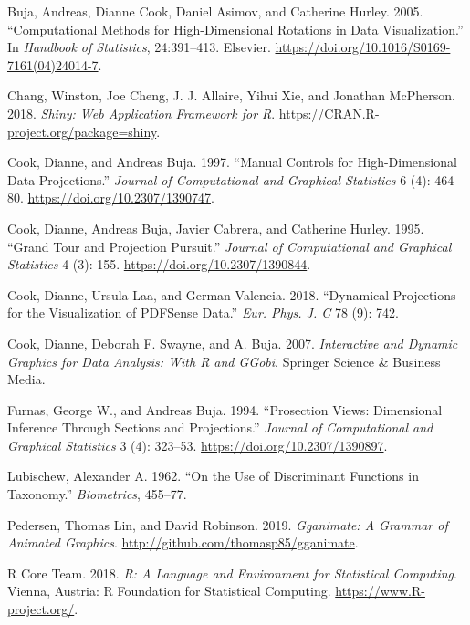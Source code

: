 \hypertarget{refs}{}
\leavevmode\hypertarget{ref-buja_computational_2005}{}%
Buja, Andreas, Dianne Cook, Daniel Asimov, and Catherine Hurley. 2005. ``Computational Methods for High-Dimensional Rotations in Data Visualization.'' In \emph{Handbook of Statistics}, 24:391--413. Elsevier. \url{https://doi.org/10.1016/S0169-7161(04)24014-7}.

\leavevmode\hypertarget{ref-chang_shiny:_2018}{}%
Chang, Winston, Joe Cheng, J. J. Allaire, Yihui Xie, and Jonathan McPherson. 2018. \emph{Shiny: Web Application Framework for R}. \url{https://CRAN.R-project.org/package=shiny}.

\leavevmode\hypertarget{ref-cook_manual_1997}{}%
Cook, Dianne, and Andreas Buja. 1997. ``Manual Controls for High-Dimensional Data Projections.'' \emph{Journal of Computational and Graphical Statistics} 6 (4): 464--80. \url{https://doi.org/10.2307/1390747}.

\leavevmode\hypertarget{ref-cook_grand_1995}{}%
Cook, Dianne, Andreas Buja, Javier Cabrera, and Catherine Hurley. 1995. ``Grand Tour and Projection Pursuit.'' \emph{Journal of Computational and Graphical Statistics} 4 (3): 155. \url{https://doi.org/10.2307/1390844}.

\leavevmode\hypertarget{ref-cook_dynamical_2018}{}%
Cook, Dianne, Ursula Laa, and German Valencia. 2018. ``Dynamical Projections for the Visualization of PDFSense Data.'' \emph{Eur. Phys. J. C} 78 (9): 742.

\leavevmode\hypertarget{ref-cook_interactive_2007}{}%
Cook, Dianne, Deborah F. Swayne, and A. Buja. 2007. \emph{Interactive and Dynamic Graphics for Data Analysis: With R and GGobi}. Springer Science \& Business Media.

\leavevmode\hypertarget{ref-furnas_prosection_1994}{}%
Furnas, George W., and Andreas Buja. 1994. ``Prosection Views: Dimensional Inference Through Sections and Projections.'' \emph{Journal of Computational and Graphical Statistics} 3 (4): 323--53. \url{https://doi.org/10.2307/1390897}.

\leavevmode\hypertarget{ref-lubischew_use_1962}{}%
Lubischew, Alexander A. 1962. ``On the Use of Discriminant Functions in Taxonomy.'' \emph{Biometrics}, 455--77.

\leavevmode\hypertarget{ref-pedersen_gganimate:_2019}{}%
Pedersen, Thomas Lin, and David Robinson. 2019. \emph{Gganimate: A Grammar of Animated Graphics}. \url{http://github.com/thomasp85/gganimate}.

\leavevmode\hypertarget{ref-r_core_team_r:_2018}{}%
R Core Team. 2018. \emph{R: A Language and Environment for Statistical Computing}. Vienna, Austria: R Foundation for Statistical Computing. \url{https://www.R-project.org/}.

